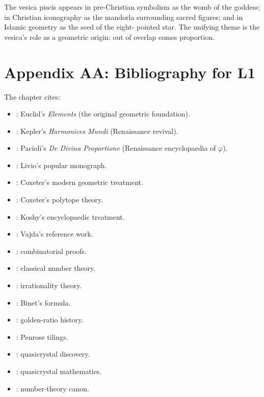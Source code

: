 The vesica piscis appears in pre-Christian symbolism as the womb of
the goddess; in Christian iconography as the mandorla surrounding
sacred figures; and in Islamic geometry as the seed of the eight-
pointed star. The unifying theme is the vesica's role as a
geometric origin: out of overlap comes proportion.

\section*{Appendix AA: Bibliography for L1}
\label{sec:01-app-AA}

The chapter cites:

\begin{itemize}
  \item \cite{euclid_elements}: Euclid's \emph{Elements} (the original
    geometric foundation).
  \item \cite{kepler_harmonices}: Kepler's \emph{Harmonices Mundi}
    (Renaissance revival).
  \item \cite{pacioli_divina}: Pacioli's \emph{De Divina Proportione}
    (Renaissance encyclopaedia of $\varphi$).
  \item \cite{livio_phi}: Livio's popular monograph.
  \item \cite{coxeter_intro_geometry}: Coxeter's modern geometric
    treatment.
  \item \cite{coxeter_regular_polytopes}: Coxeter's polytope theory.
  \item \cite{koshy_fib_lucas}: Koshy's encyclopaedic treatment.
  \item \cite{vajda_fib_lucas}: Vajda's reference work.
  \item \cite{benjamin_quinn_proofs}: combinatorial proofs.
  \item \cite{ireland_rosen}: classical number theory.
  \item \cite{niven_irrational}: irrationality theory.
  \item \cite{binet_formula}: Binet's formula.
  \item \cite{cox_golden_ratio}: golden-ratio history.
  \item \cite{penrose1974}: Penrose tilings.
  \item \cite{shechtman1984}: quasicrystal discovery.
  \item \cite{senechal_quasicrystals}: quasicrystal mathematics.
  \item \cite{hardy_wright}: number-theory canon.
\end{itemize}

